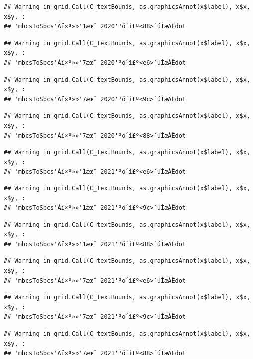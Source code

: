 \documentclass[
]{book}
\begin{document}
\begin{verbatim}
## Warning in grid.Call(C_textBounds, as.graphicsAnnot(x$label), x$x, x$y, :
## 'mbcsToSbcs'Àï×ª»»'1æœˆ 2020'³ö´í£º<88>´úÌæÁËdot
\end{verbatim}

\begin{verbatim}
## Warning in grid.Call(C_textBounds, as.graphicsAnnot(x$label), x$x, x$y, :
## 'mbcsToSbcs'Àï×ª»»'7æœˆ 2020'³ö´í£º<e6>´úÌæÁËdot
\end{verbatim}

\begin{verbatim}
## Warning in grid.Call(C_textBounds, as.graphicsAnnot(x$label), x$x, x$y, :
## 'mbcsToSbcs'Àï×ª»»'7æœˆ 2020'³ö´í£º<9c>´úÌæÁËdot
\end{verbatim}

\begin{verbatim}
## Warning in grid.Call(C_textBounds, as.graphicsAnnot(x$label), x$x, x$y, :
## 'mbcsToSbcs'Àï×ª»»'7æœˆ 2020'³ö´í£º<88>´úÌæÁËdot
\end{verbatim}

\begin{verbatim}
## Warning in grid.Call(C_textBounds, as.graphicsAnnot(x$label), x$x, x$y, :
## 'mbcsToSbcs'Àï×ª»»'1æœˆ 2021'³ö´í£º<e6>´úÌæÁËdot
\end{verbatim}

\begin{verbatim}
## Warning in grid.Call(C_textBounds, as.graphicsAnnot(x$label), x$x, x$y, :
## 'mbcsToSbcs'Àï×ª»»'1æœˆ 2021'³ö´í£º<9c>´úÌæÁËdot
\end{verbatim}

\begin{verbatim}
## Warning in grid.Call(C_textBounds, as.graphicsAnnot(x$label), x$x, x$y, :
## 'mbcsToSbcs'Àï×ª»»'1æœˆ 2021'³ö´í£º<88>´úÌæÁËdot
\end{verbatim}

\begin{verbatim}
## Warning in grid.Call(C_textBounds, as.graphicsAnnot(x$label), x$x, x$y, :
## 'mbcsToSbcs'Àï×ª»»'7æœˆ 2021'³ö´í£º<e6>´úÌæÁËdot
\end{verbatim}

\begin{verbatim}
## Warning in grid.Call(C_textBounds, as.graphicsAnnot(x$label), x$x, x$y, :
## 'mbcsToSbcs'Àï×ª»»'7æœˆ 2021'³ö´í£º<9c>´úÌæÁËdot
\end{verbatim}

\begin{verbatim}
## Warning in grid.Call(C_textBounds, as.graphicsAnnot(x$label), x$x, x$y, :
## 'mbcsToSbcs'Àï×ª»»'7æœˆ 2021'³ö´í£º<88>´úÌæÁËdot
\end{verbatim}
\end{document}
